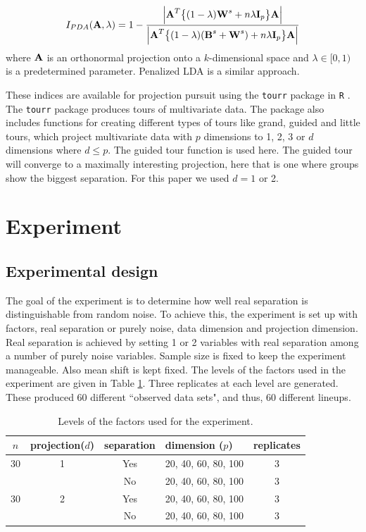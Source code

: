 \begin{eqnarray}
I_{PDA}(\mbox{\boldmath {\bf A}},\lambda) =
1-\frac{\Big|\mbox{\boldmath {\bf A}}^T\big\{(1-\lambda)\mbox{\boldmath {\bf W}}^s+n\lambda\mbox{\boldmath {\bf I}}_p\big\}
\mbox{\boldmath {\bf A}}\Big|}
              {\Big|\mbox{\boldmath {\bf A}}^T\big\{(1-\lambda)(\mbox{\boldmath {\bf B}}^s +\mbox{\boldmath {\bf W}}^s)+n\lambda\mbox{\boldmath {\bf I}}_p\big\} \mbox{\boldmath {\bf A}}\Big|}\label{PDA3}
\end{eqnarray}
where $\mbox{\boldmath {\bf A}}$ is an orthonormal projection onto a $k$-dimensional space
and $\lambda \in [0,1)$ is a predetermined parameter. Penalized LDA \citep{witten:2011} is a similar approach.

These indices are available for projection pursuit using the \texttt{tourr} package \citep{tourr:2011} in \texttt{R} \citep{r}. The \texttt{tourr} package produces tours of multivariate data. The package also includes functions for creating different types of tours like grand, guided and little tours, which project multivariate data with $p$ dimensions to 1, 2, 3 or $d$ dimensions where $d \le p$. The guided tour function is used here. The guided tour will converge to a maximally interesting projection, here that is one where groups show the biggest separation. For this paper we used $d = 1$ or 2.    


\section{Experiment} \label{sec:experiment}

\subsection{Experimental design}

The goal of the experiment is to determine how well real separation is distinguishable from random noise. To achieve this, the experiment is set up with factors, real separation or purely noise, data dimension and projection dimension. Real separation is achieved by setting 1 or 2 variables with real separation among a number of purely noise variables.  Sample size is fixed to keep the experiment manageable. Also mean shift is kept fixed. The levels of the factors used in the experiment are given in Table \ref{freq}. Three replicates at each level are generated. These produced 60 different ``observed data sets", and thus, 60 different lineups. 

\begin{table}[htbp]
\begin{center}
\caption{Levels of the factors used for the experiment.}
\begin{tabular}{cccp{2.2cm}|c}
  \hline
  \hline
  $n$ & projection($d$) & separation & dimension ($p$) & replicates\\
  \hline
  30 & 1 & Yes & 20, 40, 60, 80, 100 & 3 \\
      & & No & 20, 40, 60, 80, 100 & 3\\
   30 & 2 & Yes & 20, 40, 60, 80, 100 & 3 \\
     & & No & 20, 40, 60, 80, 100 & 3\\   
      \hline
\end{tabular}
\label{freq}
\end{center}
\end{table} 


